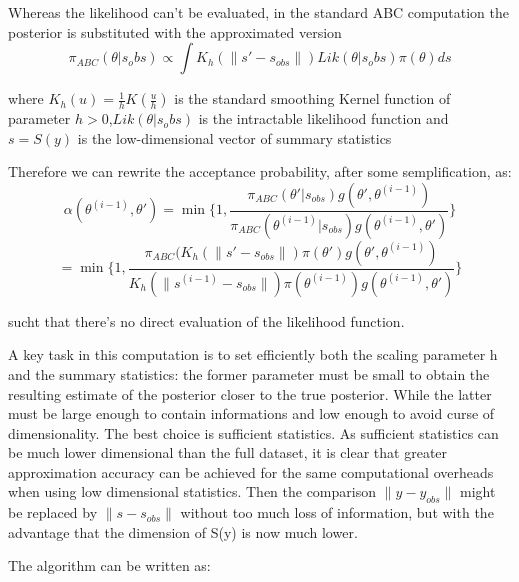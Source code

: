 \documentclass {article}
\begin{document}
Whereas the likelihood can't be evaluated, in the standard ABC computation the posterior is substituted with the approximated version $$\pi_{ABC}(\theta|s_obs) \propto \int K_h(\parallel s'-s_{obs}\parallel)Lik(\theta|s_obs)\pi(\theta) ds $$

where ${K_h(u)}  =  \frac{1}{h}  K \left( \frac{u}{h} \right)$ is the standard smoothing Kernel function of parameter $ h>0$,$ Lik(\theta|s_obs)$ is the intractable likelihood function and $s=S(y)$ is the low-dimensional vector of summary statistics

Therefore we can rewrite the acceptance probability, after some semplification, as:
 $$ \alpha(\theta^{(i-1)},\theta')= \min  \{ 1, \frac{\pi_{ABC}(\theta'|s_{obs})g(\theta',\theta^{(i-1)})}{\pi_{ABC}(\theta^{(i-1)}|s_{obs})g(\theta^{(i-1)},\theta') } \} $$
 $$ =\min  \{ 1, \frac{\pi_{ABC}(K_h(\parallel s'-s_{obs}\parallel)   \pi(\theta')g(\theta',\theta^{(i-1)})}{K_h(\parallel s^{(i-1)}-s_{obs}\parallel)   \pi(\theta^{(i-1)})g(\theta^{(i-1)},\theta') } \} $$

sucht that there's no direct evaluation of the likelihood function.

A key task in this computation is to set efficiently both the scaling parameter h and the summary statistics:
the former parameter must be small to obtain the resulting estimate of the posterior closer to the true posterior. While the latter must be large enough to contain informations and low enough to avoid curse of dimensionality.
The best choice is sufficient statistics. As sufficient statistics can be much lower dimensional than the full dataset, it is clear that greater approximation accuracy can be achieved for the same computational overheads when using low dimensional statistics.
Then the comparison $\parallel y-y_{obs} \parallel$ might be replaced by $\parallel s-s_{obs} \parallel$ without too much loss of information, but with the advantage that the dimension of S(y) is now much lower.

The algorithm can be written as:
\end{document}
